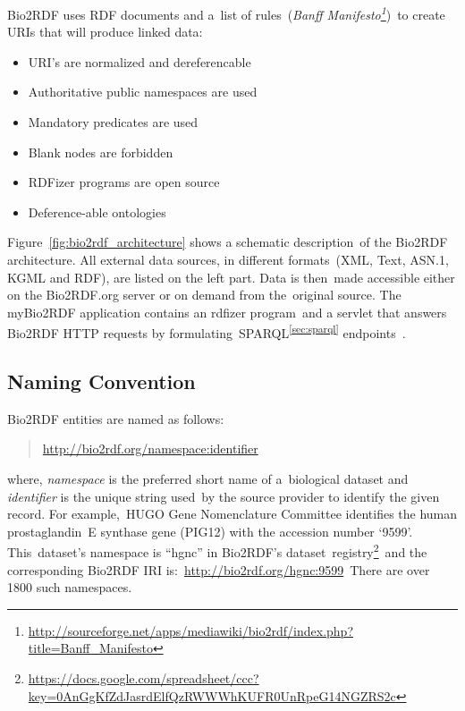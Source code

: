   \noindent Bio2RDF uses RDF documents and a\
  list of rules\
  (\emph{Banff Manifesto\footnote{\url{http://sourceforge.net/apps/mediawiki/bio2rdf/index.php?title=Banff_Manifesto}}})\
  to create URIs that will produce linked data:
  \begin{itemize}
    \itemindent3em
    \itemsep0ex
    \item [\textbf{Rule 1:}] URI's are normalized and dereferencable
    \item [\textbf{Rule 2:}] Authoritative public namespaces are used 
    \item [\textbf{Rule 3:}] Mandatory predicates are used
    \item [\textbf{Rule 4:}] Blank nodes are forbidden
    \item [\textbf{Rule 5:}] RDFizer programs are open source
    \item [\textbf{Rule 6:}] Deference-able ontologies
  \end{itemize}
  Figure~\ref{fig:bio2rdf_architecture} shows a schematic description\
  of the Bio2RDF architecture. All external data sources, in different formats\
  (XML, Text, ASN.1, KGML and RDF), are listed on the left part. Data is then\
  made accessible either on the Bio2RDF.org server or on demand from the\
  original source. The myBio2RDF application contains an rdfizer program\
  and a servlet that answers Bio2RDF HTTP requests by formulating\
  SPARQL\textsuperscript{\ref{sec:sparql}} endpoints~\citep{callahan_bio2rdf_2013}.\\
  
  \subsection{Naming Convention}
  Bio2RDF entities are named as follows:
  \begin{quote}
    \url{http://bio2rdf.org/namespace:identifier}
  \end{quote}
  \noindent where, \emph{namespace} is the preferred short name of a\
  biological dataset and \emph{identifier} is the unique string used\
  by the source provider to identify the given record. For example,\
  HUGO Gene Nomenclature Committee identifies the human prostaglandin\
  E synthase gene (PIG12) with the accession number `9599'. This\
  dataset's namespace is ``hgnc'' in Bio2RDF's dataset\
  registry\footnote{\url{https://docs.google.com/spreadsheet/ccc?key=0AnGgKfZdJasrdElfQzRWWWhKUFR0UnRpeG14NGZRS2c}}\
  and the corresponding Bio2RDF IRI is:~\url{http://bio2rdf.org/hgnc:9599}\
  There are over 1800 such namespaces.
  
